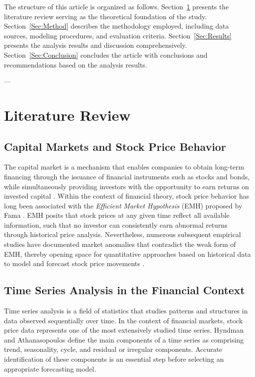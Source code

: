 \documentclass[11pt,twoside]{article}
\begin{document}
The structure of this article is organized as follows. Section~\ref{Sec:Tinjauan} presents the literature review serving as the theoretical foundation of the study. Section~\ref{Sec:Method} describes the methodology employed, including data sources, modeling procedures, and evaluation criteria. Section~\ref{Sec:Results} presents the analysis results and discussion comprehensively. Section~\ref{Sec:Conclusion} concludes the article with conclusions and recommendations based on the analysis results.

---

\section{Literature Review}
\label{Sec:Tinjauan}

\subsection{Capital Markets and Stock Price Behavior}

The capital market is a mechanism that enables companies to obtain long-term financing through the issuance of financial instruments such as stocks and bonds, while simultaneously providing investors with the opportunity to earn returns on invested capital \cite{Tandelilin2010}. Within the context of financial theory, stock price behavior has long been associated with the \textit{Efficient Market Hypothesis} (EMH) proposed by Fama \cite{Fama1970}. EMH posits that stock prices at any given time reflect all available information, such that no investor can consistently earn abnormal returns through historical price analysis. Nevertheless, numerous subsequent empirical studies have documented market anomalies that contradict the weak form of EMH, thereby opening space for quantitative approaches based on historical data to model and forecast stock price movements \cite{Box2015}.

\subsection{Time Series Analysis in the Financial Context}

Time series analysis is a field of statistics that studies patterns and structures in data observed sequentially over time. In the context of financial markets, stock price data represents one of the most extensively studied time series. Hyndman and Athanasopoulos \cite{Hyndman2018} define the main components of a time series as comprising trend, seasonality, cycle, and residual or irregular components. Accurate identification of these components is an essential step before selecting an appropriate forecasting model.
\end{document}

